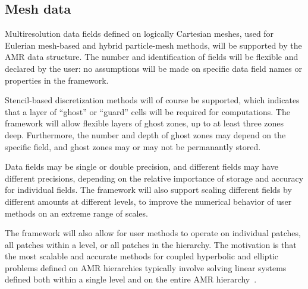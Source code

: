 \documentclass{article}
\begin{document}
\subsection{Mesh data}

Multiresolution data fields defined on logically Cartesian meshes,
used for Eulerian mesh-based and hybrid particle-mesh methods, will be
supported by the AMR data structure.  The number and identification of
fields will be flexible and declared by the user: no assumptions will
be made on specific data field names or properties in the framework.

Stencil-based discretization methods will of course be supported,
which indicates that a layer of ``ghost'' or ``guard'' cells will be
required for computations.  The framework will allow flexible layers
of ghost zones, up to at least three zones deep.  Furthermore, the number and
depth of ghost zones may depend on the specific field, and ghost zones
may or may not be permanantly stored.

Data fields may be single or double precision, and different fields
may have different precisions, depending on the relative importance of
storage and accuracy for individual fields.  The framework will also
support scaling different fields by different amounts at different
levels, to improve the numerical behavior of user methods on an
extreme range of scales.

The framework will also allow for user methods to operate on
individual patches, all patches within a level, or all patches in the
hierarchy.  The motivation is that the most scalable and accurate
methods for coupled hyperbolic and elliptic problems defined on AMR
hierarchies typically involve solving linear systems defined both
within a single level and on the entire AMR hierarchy~\cite{MiCo07}.

\end{document}
